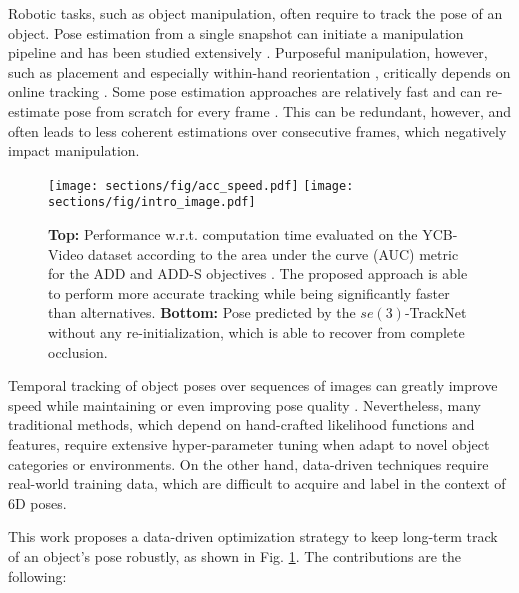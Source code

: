 \documentclass[letterpaper, 10 pt, conference]{ieeeconf}
\begin{document}
Robotic tasks, such as object manipulation, often require to track the pose of an object.  Pose estimation from a single snapshot can initiate a manipulation pipeline and has been
studied extensively \cite{xiang2017posecnn, deng2019poserbpf, mitash2019scene,deng2019self, 
issac2016depth, sundermeyer2018implicit,wang2019densefusion,li2019cdpn,he2020pvn3d}. Purposeful manipulation, however, such as placement and especially within-hand reorientation \cite{kimmel2019belief}, critically depends on online tracking \cite{mitash2020task}.  Some pose estimation approaches are relatively fast and can re-estimate pose from scratch for every frame \cite{tremblay2018deep, wang2019densefusion, sundermeyer2018implicit,wen2020robust}. This can be redundant, however, and often leads to less coherent estimations over consecutive frames, which negatively impact manipulation. 

\begin{figure}[t]
  \centering
  \texttt{[image: sections/fig/acc\_speed.pdf]}
  \texttt{[image: sections/fig/intro\_image.pdf]}
  \vspace{-.3in}
\caption{\textbf{Top:} Performance w.r.t. computation time evaluated on
the YCB-Video dataset according to the area under the curve (AUC)
metric for the ADD and ADD-S objectives \cite{xiang2017posecnn}. The
proposed approach is able to perform more accurate tracking while
being significantly faster than alternatives. \textbf{Bottom:} Pose
predicted by the $se(3)$-TrackNet without any re-initialization, which is
able to recover from complete occlusion.}
\label{fig:acc_speed}
  \vspace{-.3in}
\end{figure}

Temporal tracking of object poses over sequences of images can greatly
improve speed while maintaining or even improving pose
quality \cite{Wthrich2013ProbabilisticOT, schmidt2014dart}. Nevertheless, many
traditional methods, which depend on hand-crafted likelihood functions
and features, require extensive hyper-parameter tuning when adapt to 
novel object categories or environments. On the other hand,
data-driven techniques \cite{li2018deepim,garon2017deep} require 
real-world training data, which are difficult to acquire and
label in the context of 6D poses.

This work proposes a data-driven optimization strategy to keep long-term track of an object's pose robustly, as shown in Fig. \ref{fig:acc_speed}. The
contributions are the following:
\end{document}
